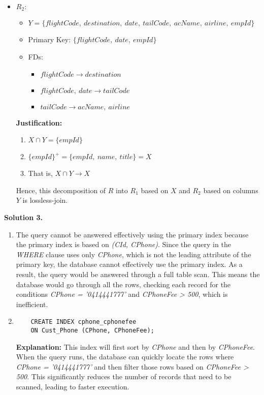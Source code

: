 \documentclass[12pt]{article}
\newcommand{\solution}[1]{\noindent \textbf{Solution #1.}}
\begin{document}
\begin{enumerate}
\begin{itemize}
        \item $R_2:$
          \begin{itemize}
            \item $Y = \{flightCode,\ destination,\ date,\ tailCode,\ acName,\ airline,\ empId\}$
            \item Primary Key: $\{flightCode,\ date,\ empId\}$
            \item FDs:
              \begin{itemize}
                \item $flightCode \rightarrow destination$
                \item $flightCode,\ date \rightarrow tailCode$
                \item $tailCode \rightarrow acName,\ airline$
              \end{itemize}
          \end{itemize}

      \textbf{Justification:}
      \begin{enumerate}
        \item $X \cap Y = \{empId\}$
        \item $\{empId\}^+ = \{empId,\ name,\ title\} = X$
        \item That is, $X \cap Y \rightarrow X$
      \end{enumerate}

      Hence, this decomposition of $R$ into $R_1$ based on $X$ and $R_2$ based on columns $Y$ is lossless-join.

      \end{itemize}

  \end{enumerate}

  \solution{3}
  \begin{enumerate}
    \item The query cannot be answered effectively using the primary index because the primary index is based on \textit{(CId, CPhone)}. Since the query in the \textit{WHERE} clause uses only \textit{CPhone}, which is not the leading attribute of the primary key, the database cannot effectively use the primary index. As a result, the query would be answered through a full table scan. This means the database would go through all the rows, checking each record for the conditions \textit{CPhone = '0414441777'} and \textit{CPhoneFee > 500}, which is inefficient.

    \item 
    \begin{verbatim}
    CREATE INDEX cphone_cphonefee
    ON Cust_Phone (CPhone, CPhoneFee);
    \end{verbatim}

    \textbf{Explanation:} This index will first sort by \textit{CPhone} and then by \textit{CPhoneFee}. When the query runs, the database can quickly locate the rows where \textit{CPhone = '0414441777'} and then filter those rows based on \textit{CPhoneFee > 500}. This significantly reduces the number of records that need to be scanned, leading to faster execution.

  \end{enumerate}
\end{document}
